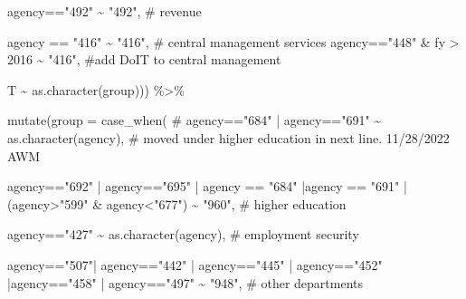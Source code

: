 \documentclass[
  letterpaper,
  DIV=11,
  numbers=noendperiod]{scrreport}
\newenvironment{Shaded}{\begin{snugshade}}{\end{snugshade}}
\newcommand{\AttributeTok}[1]{\textcolor[rgb]{0.40,0.45,0.13}{#1}}
\newcommand{\CommentTok}[1]{\textcolor[rgb]{0.37,0.37,0.37}{#1}}
\newcommand{\DecValTok}[1]{\textcolor[rgb]{0.68,0.00,0.00}{#1}}
\newcommand{\FunctionTok}[1]{\textcolor[rgb]{0.28,0.35,0.67}{#1}}
\newcommand{\NormalTok}[1]{\textcolor[rgb]{0.00,0.23,0.31}{#1}}
\newcommand{\SpecialCharTok}[1]{\textcolor[rgb]{0.37,0.37,0.37}{#1}}
\newcommand{\StringTok}[1]{\textcolor[rgb]{0.13,0.47,0.30}{#1}}
\begin{document}
\begin{Shaded}
\begin{Highlighting}[]
\NormalTok{    agency}\SpecialCharTok{==}\StringTok{"492"} \SpecialCharTok{\textasciitilde{}} \StringTok{"492"}\NormalTok{, }\CommentTok{\# revenue}
    
\NormalTok{    agency }\SpecialCharTok{==} \StringTok{"416"} \SpecialCharTok{\textasciitilde{}} \StringTok{"416"}\NormalTok{, }\CommentTok{\# central management services}
\NormalTok{    agency}\SpecialCharTok{==}\StringTok{"448"} \SpecialCharTok{\&}\NormalTok{ fy }\SpecialCharTok{\textgreater{}} \DecValTok{2016} \SpecialCharTok{\textasciitilde{}} \StringTok{"416"}\NormalTok{, }\CommentTok{\#add DoIT to central management }
    
\NormalTok{    T }\SpecialCharTok{\textasciitilde{}} \FunctionTok{as.character}\NormalTok{(group))) }\SpecialCharTok{\%\textgreater{}\%}
  
  
  \FunctionTok{mutate}\NormalTok{(}\AttributeTok{group =} \FunctionTok{case\_when}\NormalTok{(}
    \CommentTok{\# agency=="684" | agency=="691"  \textasciitilde{} as.character(agency), \# moved under higher education in next line. 11/28/2022 AWM}
    
\NormalTok{    agency}\SpecialCharTok{==}\StringTok{"692"} \SpecialCharTok{|}\NormalTok{ agency}\SpecialCharTok{==}\StringTok{"695"} \SpecialCharTok{|}\NormalTok{ agency }\SpecialCharTok{==} \StringTok{"684"} \SpecialCharTok{|}\NormalTok{agency }\SpecialCharTok{==} \StringTok{"691"} \SpecialCharTok{|}\NormalTok{ (agency}\SpecialCharTok{\textgreater{}}\StringTok{"599"} \SpecialCharTok{\&}\NormalTok{ agency}\SpecialCharTok{\textless{}}\StringTok{"677"}\NormalTok{) }\SpecialCharTok{\textasciitilde{}} \StringTok{"960"}\NormalTok{, }\CommentTok{\# higher education}
    
\NormalTok{    agency}\SpecialCharTok{==}\StringTok{"427"}  \SpecialCharTok{\textasciitilde{}} \FunctionTok{as.character}\NormalTok{(agency), }\CommentTok{\# employment security}
    
\NormalTok{    agency}\SpecialCharTok{==}\StringTok{"507"}\SpecialCharTok{|}\NormalTok{  agency}\SpecialCharTok{==}\StringTok{"442"} \SpecialCharTok{|}\NormalTok{ agency}\SpecialCharTok{==}\StringTok{"445"} \SpecialCharTok{|}\NormalTok{ agency}\SpecialCharTok{==}\StringTok{"452"} \SpecialCharTok{|}\NormalTok{agency}\SpecialCharTok{==}\StringTok{"458"} \SpecialCharTok{|}\NormalTok{ agency}\SpecialCharTok{==}\StringTok{"497"} \SpecialCharTok{\textasciitilde{}} \StringTok{"948"}\NormalTok{, }\CommentTok{\# other departments}
    

\end{Highlighting}
\end{Shaded}
\end{document}
